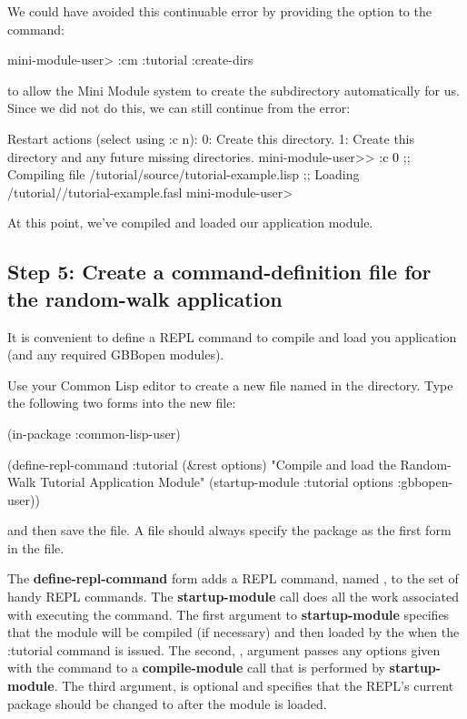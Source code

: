 \documentclass[10pt,twoside,english,pdftex]{article}
\begin{document}
We could have avoided this continuable error by providing the
 option to the  command:
%
\W\supp
\begin{example}
\textcolor{darkergray}{%
  mini-module-user> :cm :tutorial :create-dirs}
\end{example}
%
to allow the Mini Module system to create the 
subdirectory automatically for us.  Since we did not do this, we can still
continue from the error:
%
\W\supp\notpretop
\begin{example}
\textcolor{darkergray}{%
  Restart actions (select using :c n):
    0: Create this directory.
    1: Create this directory and any future missing directories.
  mini-module-user>> \textcolor{black}{:c 0}
  ;; Compiling file /tutorial/source/tutorial-example.lisp
  ;; Loading /tutorial//tutorial-example.fasl
  mini-module-user>}
\end{example}

At this point, we've compiled and loaded our  application
module.

\subsection*{Step 5: Create a command-definition file for the random-walk
  application}

It is convenient to define a REPL command to compile and load you application
(and any required GBBopen modules).  

Use your Common Lisp editor to create a new file named  in
the  directory. Type the following two forms into the new
 file:
%
\W\supp
\begin{example}
(in-package :common-lisp-user)

(define-repl-command :tutorial (\&rest options)
  "Compile and load the Random-Walk Tutorial Application Module"
  (startup-module :tutorial options :gbbopen-user))
\end{example}
%
and then save the file.  A  file should always specify the
 package as the first form in the file.

The \textbf{define-repl-command} form adds a REPL command, named
, to the set of handy REPL commands.  The
\textbf{startup-module} call does all the work associated with executing the
command.  The first argument to \textbf{startup-module} specifies that the
 module will be compiled (if necessary) and then loaded by the
 when the \code:{tutorial}
command is issued.  The second, , argument passes any options
given with the command to a \textbf{compile-module} call that is performed by
\textbf{startup-module}.  The third argument,  is optional
and specifies that the REPL's current package should be changed to  after the  module is loaded. 
\end{document}

